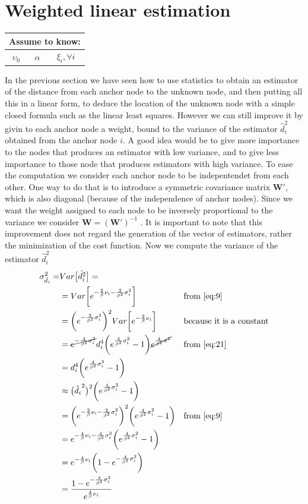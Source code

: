 \documentclass[12pt]{report}
\begin{document}
\section{Weighted linear estimation}
 \begin{center}
\begin{tabular}{ |c|c|c| } 
 \hline
\multicolumn{3}{|c|}{ \textbf{Assume to know:} } \\
 \hline
 $\upsilon_0$ & $\alpha$ & $\xi_i,\forall i$\\
 \hline
\end{tabular}
\end{center}
In the previous section we have seen how to use statistics to obtain an estimator of the distance from each anchor node to the unknown node, and then putting all this in a linear form, to deduce the location of the unknown node with a simple closed formula such as the linear least squares. However we can still improve it by givin to each anchor node a weight, bound to the variance of the estimator $\hat{d}_i^2$ obtained from the anchor node $i$. A good idea would be to give more importance to the nodes that produces an estimator with low variance, and to give less importance to those node that produces estimators with high variance. To ease the computation we consider each anchor node to be indepentendet from each other. One way to do that is to introduce a symmetric covariance matrix $\mathbf{W}'$, which is also diagonal (because of the independence of anchor nodes). Since we want the weight assigned to each node to be inversely proportional to the variance we consider $\mathbf{W}=(\mathbf{W}')^{-1}$ \cite{rzk,899498y4hd}. It is important to note that this improvement does not regard the generation of the vector of estimators, rather the minimization of the cost function. Now we compute the variance of the estimator $\hat{d}_i^2$
\begin{align}
\sigma^2_{\hat{d_i}}=&Var\big[\hat{d_i^2}\big]=&& \\
&=Var\bigg[e^{-\frac{2}{\beta}\nu_i-\frac{2}{\beta^2}\sigma^2_i}\bigg] && \text{from \ref{eq:9}}\\
&=\bigg(e^{-\frac{2}{\beta^2}\sigma^2_i}\bigg)^2Var\bigg[e^{-\frac{2}{\beta}\nu_i}\bigg]&& \text{because it is a constant}\\
&=\cancel{e^{-\frac{4}{\beta^2}\sigma^2_i}}d_i^4\bigg(e^{\frac{4}{\beta^2}\sigma_i^2}-1\bigg)\cancel{e^{\frac{4}{\beta^2}\sigma^2}} &&\text{from } \ref{eq:21}\\
&=d_i^4\bigg(e^{\frac{4}{\beta^2}\sigma_i^2}-1\bigg)\\
&\approx \big(\hat{d_i}^2\big)^2\bigg(e^{\frac{4}{\beta^2}\sigma_i^2}-1\bigg)\\
&=\bigg(e^{-\frac{2}{\beta}\nu_i-\frac{2}{\beta^2}\sigma^2_i}\bigg)^2\bigg(e^{\frac{4}{\beta^2}\sigma_i^2}-1\bigg)&&\text{from }\ref{eq:9}\\
&=e^{-\frac{4}{\beta}\nu_i-\frac{4}{\beta^2}\sigma^2_i}\bigg(e^{\frac{4}{\beta^2}\sigma^2_i}-1\bigg)\\
&=e^{-\frac{4}{\beta}\nu_i}\bigg(1-e^{-\frac{4}{\beta^2}\sigma^2_i}\bigg)\\
&=\frac{1-e^{-\frac{4}{\beta^2}\sigma^2_i}}{e^{\frac{4}{\beta}\nu_i}}
\end{align}
\end{document}

